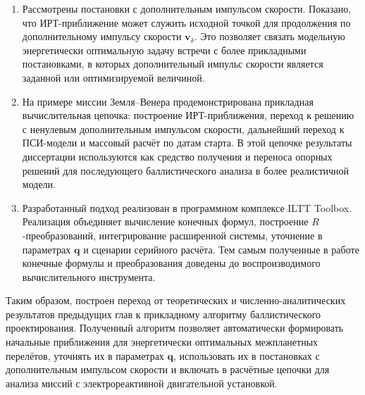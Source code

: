 \begin{enumerate}
	\item
Рассмотрены постановки с дополнительным импульсом скорости. Показано, что ИРТ-приближение может служить исходной точкой для продолжения по дополнительному импульсу скорости \(\mathbf v_\delta\). Это позволяет связать модельную энергетически оптимальную задачу встречи с более прикладными постановками, в которых дополнительный импульс скорости является заданной или оптимизируемой величиной.

	\item
На примере миссии Земля--Венера продемонстрирована прикладная вычислительная цепочка: построение ИРТ-приближения, переход к решению с ненулевым дополнительным импульсом скорости, дальнейший переход к ПСИ-модели и массовый расчёт по датам старта. В этой цепочке результаты диссертации используются как средство получения и переноса опорных решений для последующего баллистического анализа в более реалистичной модели.

	\item Разработанный подход реализован в программном комплексе ILTT Toolbox. Реализация объединяет вычисление конечных формул, построение \(R\)-преобразований, интегрирование расширенной системы, уточнение в параметрах \(\mathbf q\) и сценарии серийного расчёта. Тем самым полученные в работе конечные формулы и преобразования доведены до воспроизводимого вычислительного инструмента.
\end{enumerate}

Таким образом, построен переход от теоретических и численно-аналитических результатов предыдущих глав к прикладному алгоритму баллистического проектирования. Полученный алгоритм позволяет автоматически формировать начальные приближения для энергетически оптимальных межпланетных перелётов, уточнять их в параметрах \(\mathbf q\), использовать их в постановках с дополнительным импульсом скорости и включать в расчётные цепочки для анализа миссий с электрореактивной двигательной установкой.

